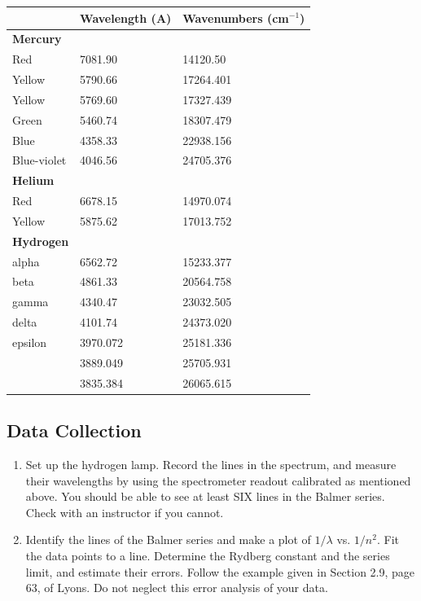 \documentclass{../lab}
\begin{document}
\begin{center}
    \begin{tabular}{l|l|l}
         & Wavelength (A) & Wavenumbers (cm$^{-1}$) \\ \hline
        \textbf{Mercury}      &            &   \\ \hline
        Red          &  7081.90   &  14120.50 \\ \hline
        Yellow       &  5790.66   &  17264.401 \\ \hline
        Yellow       &  5769.60   &  17327.439 \\ \hline
        Green        &  5460.74   &  18307.479 \\ \hline
        Blue         &  4358.33   &  22938.156 \\ \hline
        Blue-violet  &  4046.56   &  24705.376 \\ \hline
        \textbf{Helium}       &            &   \\ \hline
        Red          &  6678.15   &  14970.074 \\ \hline
        Yellow       &  5875.62   &  17013.752 \\ \hline
        \textbf{Hydrogen}     &            &   \\ \hline
        alpha        &  6562.72   &  15233.377 \\ \hline
        beta         &  4861.33   &  20564.758 \\ \hline
        gamma        &  4340.47   &  23032.505 \\ \hline
        delta        &  4101.74   &  24373.020 \\ \hline
        epsilon      &  3970.072  &  25181.336 \\ \hline
                     &  3889.049  &  25705.931 \\ \hline
                     &  3835.384  &  26065.615 \\
    \end{tabular}
\end{center}

\subsection{Data Collection}

\begin{enumerate}
    \item Set up the hydrogen lamp. Record the lines in the spectrum, and measure their wavelengths by using the spectrometer readout calibrated as mentioned above. You should be able to see at least SIX lines in the Balmer series. Check with an instructor if you cannot.

    \item Identify the lines of the Balmer series and make a plot of $1/\lambda$ vs. $1/n^2$. Fit the data points to a line. Determine the Rydberg constant and the series limit, and estimate their errors. Follow the example given in Section 2.9, page 63, of Lyons. Do not neglect this error analysis of your data.

\end{enumerate}
\end{document}
